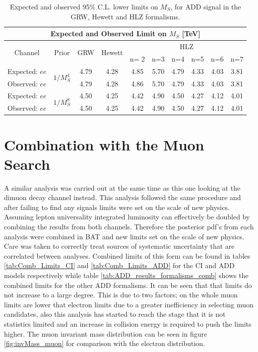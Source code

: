 \begin{table}[]
  \begin{center}
    \begin{tabular}{c|c|c|c|cccccc}
        \hline
        \hline
        \multicolumn{10}{c}{Expected and Observed Limit on $M_{S}$ [TeV]} \\
        \hline
        \multirow{2}{*}{Channel} & \multirow{2}{*}{Prior} & \multirow{2}{*}{GRW} & \multirow{2}{*}{Hewett} & \multicolumn{6}{c}{HLZ} \\
        \cline{5-10}
                &       &     &        & n= 2 &  n=3 & n=4 & n=5 & n=6 & n=7 \\
        \hline
        \hline
        Expected: $ee$      & \multirow{2}{*}{$1/M_{S}^{4}$} & 4.79 & 4.28 & 4.85 & 5.70 & 4.79 & 4.33 & 4.03 & 3.81 \\
        Observed: $ee$      &  & 4.79 & 4.28 & 4.86 & 5.70 & 4.79 & 4.33 & 4.03 & 3.81 \\
        \hline
        Expected: $ee$      & \multirow{2}{*}{$1/M_{S}^{8}$} & 4.50 & 4.25 & 4.42 & 4.90 & 4.50 & 4.27 & 4.12 & 4.01 \\
        Observed: $ee$      &  & 4.50 & 4.25 & 4.42 & 4.90 & 4.50 & 4.27 & 4.12 & 4.01 \\
        \hline
        \hline
    \end{tabular}
  \end{center}
    \caption{Expected and observed 95\% C.L. lower limits on $M_{S}$, for ADD signal in the GRW, Hewett and HLZ formalisms.
    \label{tab:ADD_results_formalisms}}
\end{table}



\section{Combination with the Muon Search}

    A similar analysis was carried out at the same time as this one looking at the dimuon decay channel instead. This analysis followed the same procedure and after failing to find any signals limits were set on the scale of new physics. Assuming lepton universality integrated luminosity can effectively be doubled by combining the results from both channels. Therefore the posterior pdf's from each analysis were combined in BAT and new limits set on the scale of new physics. Care was taken to correctly treat sources of systematic uncertainty that are correlated between analyses. Combined limits of this form can be found in tables \ref{tab:Comb_Limits_CI} and \ref{tab:Comb_Limits_ADD} for the CI and ADD models respectively while table \ref{tab:ADD_results_formalisms_comb} shows the combined limits for the other ADD formalisms. It can be seen that that limits do not increase to a large degree. This is due to two factors; on the whole muon limits are lower that electron limits due to a greater inefficiency in selecting muon candidates, also this analysis has started to reach the stage that it is not statistics limited and an increase in collision energy is required to push the limits higher. The muon invariant mass distribution can be seen in figure \ref{fig:invMass_muon} for comparison with the electron distribution. 

